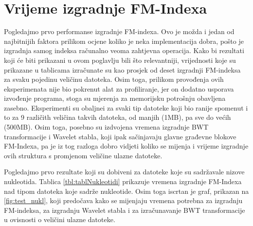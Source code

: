 \section{Vrijeme izgradnje FM-Indexa}
Pogledajmo prvo performanse izgradnje FM-indexa. Ovo je možda i jedan od najbitnijih faktora prilikom ocjene koliko je neka implementacija dobra, pošto je izgradnja samog indeksa računalno veoma zahtjevna operacija. Kako bi rezultati koji će biti prikazani u ovom poglavlju bili što relevantniji, vrijednosti koje su prikazane u tablicama izračunate su kao prosjek od deset izgradnji FM-indeksa za svaku pojedinu veličinu datoteka. Osim toga, prilikom provođenja ovih eksperimenata nije bio pokrenut alat za profiliranje, jer on dodatno usporava izvođenje programa, stoga su mjerenja za memorijsku potrošnju obavljena zasebno. Eksperimenti su obaljnei za svaki tip datoteke koji bio ranije spomenut i to za 9 različith veličina takvih datoteka, od manjih (1MB), pa sve do većih (500MB). Osim toga, posebno su izdvojena vremena izgradnje BWT transformacije i Wavelet stabla, koji ipak sačinjavaju glavne građevne blokove FM-Indexa, pa je iz tog razloga dobro vidjeti koliko se mijenja i vrijeme izgradnje ovih struktura s promjenom veličine ulazne datoteke.

Pogledajmo prvo rezultate koji su dobiveni za datoteke koje su sadržavale nizove nukleotida. Tablica \ref{tbl:tablNukleotidi} prikazuje vremena izgradnje FM-Indexa nad tipom datoteka koje sadrže nukleotide. Osim toga iscrtan je graf, prikazan na \ref{fig:test_nukl}, koji predočava kako se mijenjaju vremena potrebna za izgradnju FM-indeksa, za izgradnju Wavelet stabla i za izračunavanje BWT transformacije u ovisnosti o veličini ulazne datoteke.

